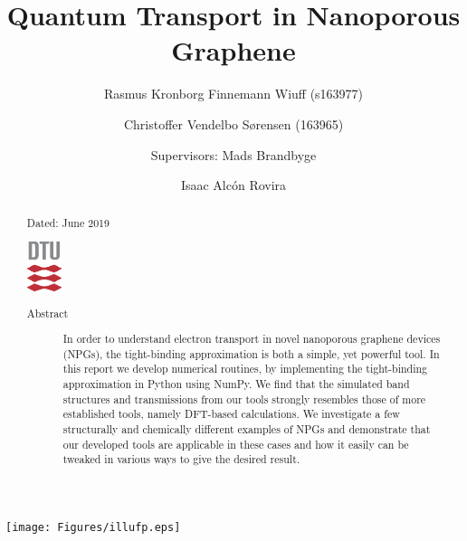 \documentclass[aps, prb, a4paper, english, 12pt, onecolumn, longbibliography, amsmath, amssymb, colorinlistoftodos, floatfix, svgnames]{revtex4-2}
\numberwithin{equation}{section}
\begin{document}
\begin{abstract}
	\vspace{-1.6em}
	\begin{center}
		\hspace{.19\textwidth} Dated: June  2019\newline
	\end{center}
	\centering
	\includegraphics[width=1cm]{Figures/DTU3CMYK.eps}
	\begin{description}
		\item[Abstract] In order to understand electron transport in novel nanoporous graphene devices (NPGs), the tight-binding approximation is both a simple, yet powerful tool. In this report we develop numerical routines, by implementing the tight-binding approximation in Python using NumPy. We find that the simulated band structures and transmissions from our tools strongly resembles those of more established tools, namely DFT-based calculations. We investigate a few structurally and chemically different examples of NPGs and demonstrate that our developed tools are applicable in these cases and how it easily can be tweaked in various ways to give the desired result.
	\end{description}
\end{abstract}
\title{Quantum Transport in Nanoporous Graphene}
\author{Rasmus Kronborg Finnemann Wiuff (s163977)}
\author{Christoffer Vendelbo Sørensen (163965)}
\author{Supervisors: Mads Brandbyge}
\author{Isaac Alcón Rovira}
\maketitle
{\centering
	\texttt{[image: Figures/illufp.eps]}
	\par}
\newpage
{}
\twocolumngrid
\tableofcontents
\thispagestyle{empty}
\newpage
\onecolumngrid

\makeatletter
\let\toc@pre\relax
\let\toc@post\relax
\makeatother
\end{document}
